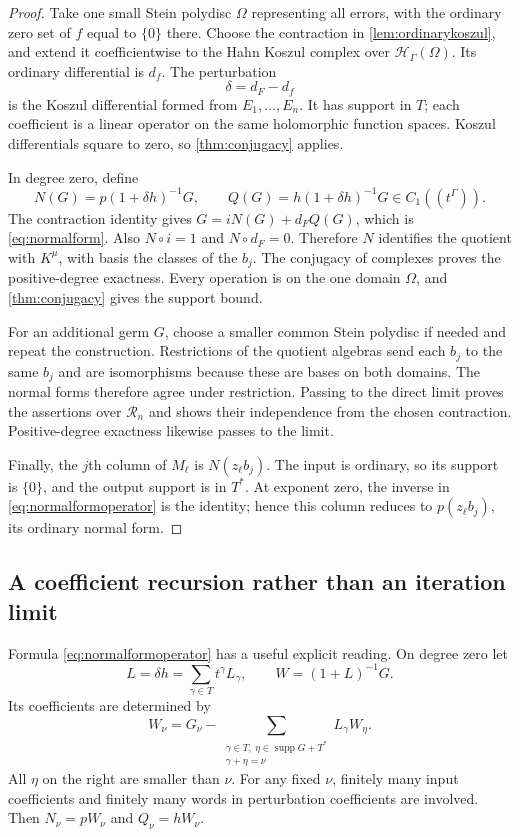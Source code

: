 \documentclass[11pt]{article}
\theoremstyle{definition}
\newcommand{\HH}{\mathcal H}
\newcommand{\RR}{\mathscr R}
\newcommand{\supp}{\operatorname{supp}}
\begin{document}
\begin{proof}
Take one small Stein polydisc $\Omega$ representing all errors, with the ordinary zero set of $f$ equal to $\{0\}$ there. Choose the contraction in \cref{lem:ordinarykoszul}, and extend it coefficientwise to the Hahn Koszul complex over $\HH_\Gamma(\Omega)$. Its ordinary differential is $d_f$. The perturbation
\[
 \delta=d_F-d_f
\]
is the Koszul differential formed from $E_1,\ldots,E_n$. It has support in $T$; each coefficient is a linear operator on the same holomorphic function spaces. Koszul differentials square to zero, so \cref{thm:conjugacy} applies.

In degree zero, define
\begin{equation}\label{eq:normalformoperator}
 N(G)=p(1+\delta h)^{-1}G,
 \qquad Q(G)=h(1+\delta h)^{-1}G\in C_1((t^\Gamma)).
\end{equation}
The contraction identity gives $G=iN(G)+d_FQ(G)$, which is \eqref{eq:normalform}. Also $N\circ i=1$ and $N\circ d_F=0$. Therefore $N$ identifies the quotient with $K^\mu$, with basis the classes of the $b_j$. The conjugacy of complexes proves the positive-degree exactness. Every operation is on the one domain $\Omega$, and \cref{thm:conjugacy} gives the support bound.

For an additional germ $G$, choose a smaller common Stein polydisc if needed and repeat the construction. Restrictions of the quotient algebras send each $b_j$ to the same $b_j$ and are isomorphisms because these are bases on both domains. The normal forms therefore agree under restriction. Passing to the direct limit proves the assertions over $\RR_n$ and shows their independence from the chosen contraction. Positive-degree exactness likewise passes to the limit.

Finally, the $j$th column of $M_\ell$ is $N(z_\ell b_j)$. The input is ordinary, so its support is $\{0\}$, and the output support is in $T^*$. At exponent zero, the inverse in \eqref{eq:normalformoperator} is the identity; hence this column reduces to $p(z_\ell b_j)$, its ordinary normal form.
\end{proof}

\subsection{A coefficient recursion rather than an iteration limit}
Formula \eqref{eq:normalformoperator} has a useful explicit reading. On degree zero let
\[
 L=\delta h=\sum_{\gamma\in T}t^\gamma L_\gamma,
 \qquad W=(1+L)^{-1}G.
\]
Its coefficients are determined by
\begin{equation}\label{eq:Wrecursion}
 W_\nu=G_\nu-
 \sum_{\substack{\gamma\in T,\ \eta\in\supp G+T^*\\
                  \gamma+\eta=\nu}}
 L_\gamma W_\eta.
\end{equation}
All $\eta$ on the right are smaller than $\nu$. For any fixed $\nu$, finitely many input coefficients and finitely many words in perturbation coefficients are involved. Then $N_\nu=pW_\nu$ and $Q_\nu=hW_\nu$.
\end{document}
